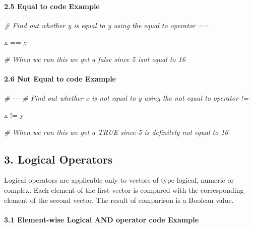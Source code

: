 \documentclass[
]{article}
\newenvironment{Shaded}{\begin{snugshade}}{\end{snugshade}}
\newcommand{\CommentTok}[1]{\textcolor[rgb]{0.56,0.35,0.01}{\textit{#1}}}
\newcommand{\NormalTok}[1]{#1}
\newcommand{\SpecialCharTok}[1]{\textcolor[rgb]{0.00,0.00,0.00}{#1}}
\begin{document}
\hypertarget{equal-to-code-example}{%
\paragraph{2.5 Equal to code Example}\label{equal-to-code-example}}

\begin{Shaded}
\begin{Highlighting}[]

\CommentTok{\# Find out whether y is equal to y using the equal to operator ==}

\NormalTok{x }\SpecialCharTok{==}\NormalTok{ y}

\CommentTok{\# When we run this we get a false since 5 isn\textquotesingle{}t equal to 16}
\end{Highlighting}
\end{Shaded}

\hypertarget{not-equal-to-code-example}{%
\paragraph{2.6 Not Equal to code
Example}\label{not-equal-to-code-example}}

\begin{Shaded}
\begin{Highlighting}[]

\CommentTok{\# {-}{-}{-}}
\CommentTok{\# Find out whether x is not equal to y using the not equal to operator !=}

\NormalTok{x }\SpecialCharTok{!=}\NormalTok{ y}

\CommentTok{\# When we run this we get a TRUE since 5 is definitely not equal to 16}
\end{Highlighting}
\end{Shaded}

\hypertarget{logical-operators}{%
\subsection{3. Logical Operators}\label{logical-operators}}

Logical operators are applicable only to vectors of type logical,
numeric or complex. Each element of the first vector is compared with
the corresponding element of the second vector. The result of comparison
is a Boolean value.

\hypertarget{element-wise-logical-and-operator-code-example}{%
\paragraph{3.1 Element-wise Logical AND operator code
Example}\label{element-wise-logical-and-operator-code-example}}
\end{document}
